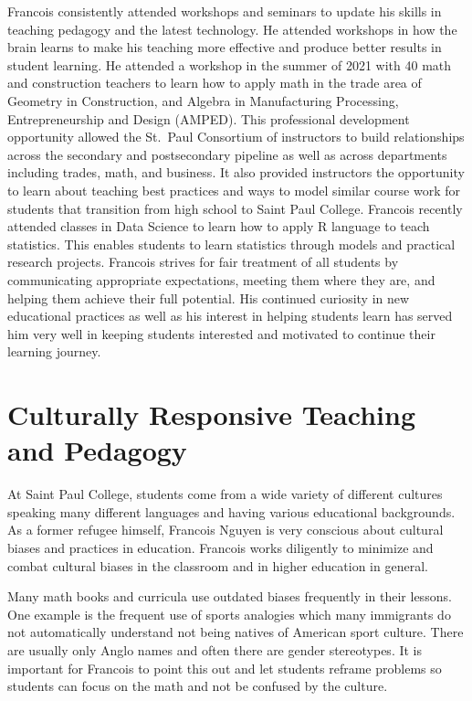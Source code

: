 \documentclass[
]{book}
\begin{document}
Francois consistently attended workshops and seminars to update his skills in teaching pedagogy and the latest technology. He attended workshops in how the brain learns to make his teaching more effective and produce better results in student learning. He attended a workshop in the summer of 2021 with 40 math and construction teachers to learn how to apply math in the trade area of Geometry in Construction, and Algebra in Manufacturing Processing, Entrepreneurship and Design (AMPED). This professional development opportunity allowed the St.~Paul Consortium of instructors to build relationships across the secondary and postsecondary pipeline as well as across departments including trades, math, and business. It also provided instructors the opportunity to learn about teaching best practices and ways to model similar course work for students that transition from high school to Saint Paul College.
Francois recently attended classes in Data Science to learn how to apply R language to teach statistics. This enables students to learn statistics through models and practical research projects.
Francois strives for fair treatment of all students by communicating appropriate expectations, meeting them where they are, and helping them achieve their full potential. His continued curiosity in new educational practices as well as his interest in helping students learn has served him very well in keeping students interested and motivated to continue their learning journey.

\chapter{Culturally Responsive Teaching and Pedagogy}\label{culturally-responsive-teaching-and-pedagogy}

At Saint Paul College, students come from a wide variety of different cultures speaking many different languages and having various educational backgrounds. As a former refugee himself, Francois Nguyen is very conscious about cultural biases and practices in education. Francois works diligently to minimize and combat cultural biases in the classroom and in higher education in general.

Many math books and curricula use outdated biases frequently in their lessons. One example is the frequent use of sports analogies which many immigrants do not automatically understand not being natives of American sport culture. There are usually only Anglo names and often there are gender stereotypes. It is important for Francois to point this out and let students reframe problems so students can focus on the math and not be confused by the culture.
\end{document}
